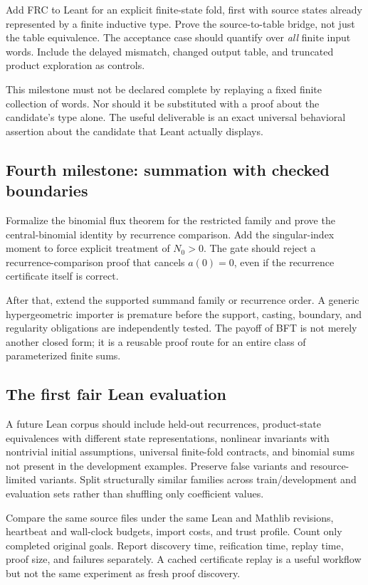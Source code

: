 Add FRC to Leant for an explicit finite-state fold, first with source states already represented by a finite inductive type. Prove the source-to-table bridge, not just the table equivalence. The acceptance case should quantify over \emph{all} finite input words. Include the delayed mismatch, changed output table, and truncated product exploration as controls.

This milestone must not be declared complete by replaying a fixed finite collection of words. Nor should it be substituted with a proof about the candidate's type alone. The useful deliverable is an exact universal behavioral assertion about the candidate that Leant actually displays.

\subsection{Fourth milestone: summation with checked boundaries}

Formalize the binomial flux theorem for the restricted family and prove the central-binomial identity by recurrence comparison. Add the singular-index moment to force explicit treatment of $N_0>0$. The gate should reject a recurrence-comparison proof that cancels $a(0)=0$, even if the recurrence certificate itself is correct.

After that, extend the supported summand family or recurrence order. A generic hypergeometric importer is premature before the support, casting, boundary, and regularity obligations are independently tested. The payoff of BFT is not merely another closed form; it is a reusable proof route for an entire class of parameterized finite sums.

\subsection{The first fair Lean evaluation}

A future Lean corpus should include held-out recurrences, product-state equivalences with different state representations, nonlinear invariants with nontrivial initial assumptions, universal finite-fold contracts, and binomial sums not present in the development examples. Preserve false variants and resource-limited variants. Split structurally similar families across train/development and evaluation sets rather than shuffling only coefficient values.

Compare the same source files under the same Lean and Mathlib revisions, heartbeat and wall-clock budgets, import costs, and trust profile. Count only completed original goals. Report discovery time, reification time, replay time, proof size, and failures separately. A cached certificate replay is a useful workflow but not the same experiment as fresh proof discovery.

